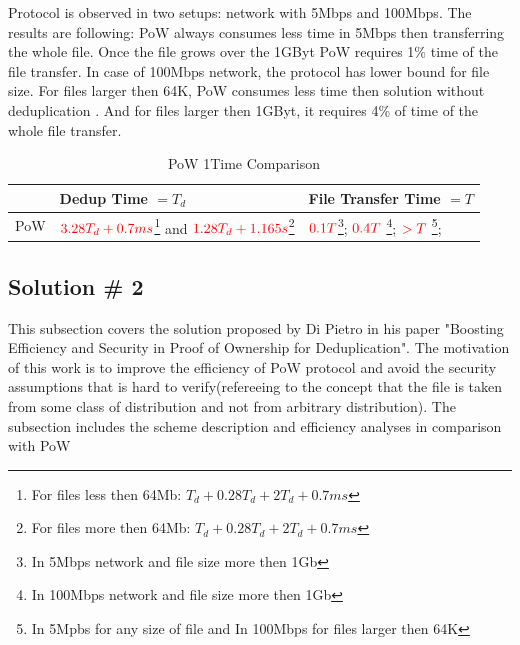 \documentclass[12pt]{article}
\begin{document}
Protocol is observed in two setups: network with 5Mbps and 100Mbps. The results are following: PoW always consumes less time in 5Mbps then transferring the whole file. Once the file grows over the 1GByt PoW requires 1\%  time of the file transfer. In case of 100Mbps network, the protocol has lower bound for file size. For files larger then 64K, PoW consumes less time then solution without deduplication . And for files larger then 1GByt, it requires 4\% of time of the whole file transfer. 

\begin{savenotes}
\begin{table}[!htpb]
\centering
\addtolength{\tabcolsep}{3pt}
\begin{tabular}{|L{1cm}|L{4.5cm}|L{4.5cm}|}
\hline
&Dedup Time  $= T_d$ &File Transfer Time $=T$ \\
\hline
PoW & $\color{red} 3.28T_d+0.7ms$\footnote{For files less then 64Mb: $T_d+0.28T_d+2T_d+0.7ms$}  and $\color{red} 1.28T_d+1.165s$\footnote{For files more then 64Mb: $T_d+0.28T_d+2T_d+0.7ms$ } 
& $\color{red} 0.1T$\footnote{In 5Mbps network and file size more then 1Gb}; $\color{red} 0.4T$ \footnote{In 100Mbps network and file size more then 1Gb}; 
$\color{red} > T$ \footnote{In 5Mpbs for any size of file and In 100Mbps for files larger then 64K}; \\
\hline

\end{tabular}
\caption{PoW 1Time Comparison}
\label{table:paramProbCodes}
\end{table}
\end{savenotes}



\subsection{Solution \# 2}
\label{sub:Soltuion2}
This subsection covers the solution proposed by Di Pietro\cite{DiPietro} in his paper "Boosting Efficiency and Security in Proof of Ownership for Deduplication". The motivation of this work is to improve the efficiency of PoW\cite{PoW} protocol and avoid the security  assumptions that is hard to verify(refereeing to the concept that the file is taken from some class of distribution and not from arbitrary distribution). The subsection includes the scheme description and efficiency analyses in comparison with PoW\cite{PoW} 
\end{document}
